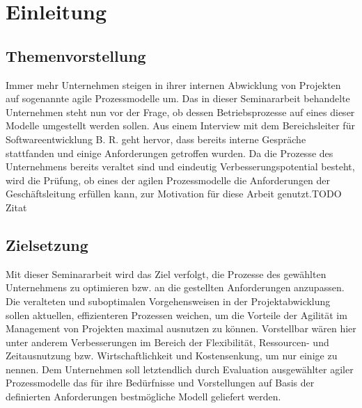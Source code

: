 \section{Einleitung}
\subsection{Themenvorstellung}
Immer mehr Unternehmen steigen in ihrer internen Abwicklung von Projekten auf sogenannte agile Prozessmodelle um. Das in dieser Seminararbeit behandelte Unternehmen steht nun vor der Frage, ob dessen Betriebsprozesse auf eines dieser Modelle umgestellt werden sollen. Aus einem Interview mit dem Bereichsleiter für Softwareentwicklung B. R. geht hervor, dass bereits interne Gespräche stattfanden und einige Anforderungen getroffen wurden. Da die Prozesse des Unternehmens bereits veraltet sind und eindeutig Verbesserungspotential besteht, wird die Prüfung, ob eines der agilen Prozessmodelle die Anforderungen der Geschäftsleitung erfüllen kann, zur Motivation für diese Arbeit genutzt.TODO Zitat

\subsection{Zielsetzung}
Mit dieser Seminararbeit wird das Ziel verfolgt, die Prozesse des gewählten Unternehmens zu optimieren bzw. an die gestellten Anforderungen anzupassen. Die veralteten und suboptimalen Vorgehensweisen in der Projektabwicklung sollen aktuellen, effizienteren Prozessen weichen, um die Vorteile der Agilität im Management von Projekten maximal ausnutzen zu können. Vorstellbar wären hier unter anderem Verbesserungen im Bereich der Flexibilität, Ressourcen- und Zeitausnutzung bzw. Wirtschaftlichkeit und Kostensenkung, um nur einige zu nennen. Dem Unternehmen soll letztendlich durch Evaluation ausgewählter agiler Prozessmodelle das für ihre Bedürfnisse und Vorstellungen auf Basis der definierten Anforderungen bestmögliche Modell geliefert werden.


